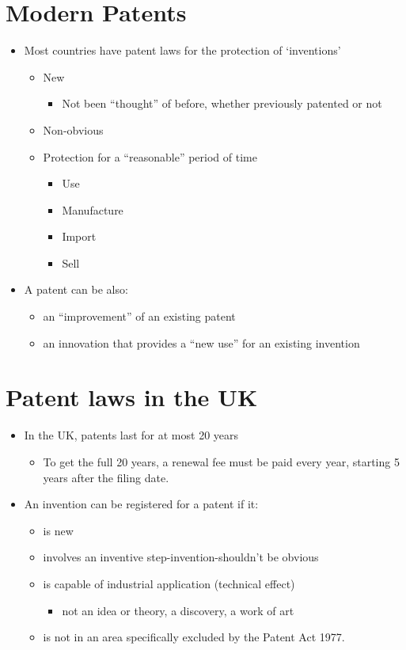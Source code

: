 \documentclass{article}
\begin{document}
\section{Modern Patents}
\begin{itemize}
\item Most countries have patent laws for the protection of `inventions' 
\begin{itemize}
\item New 
\begin{itemize}
\item Not been ``thought'' of before, whether previously patented or not
\end{itemize}
\item Non-obvious
\item Protection for a ``reasonable'' period of time
\begin{itemize}
\item Use
\item Manufacture
\item Import
\item Sell
\end{itemize}
\end{itemize}
\item A patent can be also:
\begin{itemize}
\item an ``improvement'' of an existing patent
\item an innovation that provides a ``new use'' for an existing invention 
\end{itemize}
\end{itemize}



\section{Patent laws in the UK}
\begin{itemize}
\item In the UK, patents last for at most 20 years
\begin{itemize}
\item To get the full 20 years, a renewal fee must be paid every year, starting 5 years after the filing date.
\end{itemize}
\item An invention can be registered for a patent if it:
\begin{itemize}
\item is new
\item involves an inventive step-invention-shouldn't be obvious
\item is capable of industrial application (technical effect)
\begin{itemize}
\item not an idea or theory, a discovery, a work of art
\end{itemize}
\item is not in an area specifically excluded by  the Patent Act 1977.
\end{itemize}
\end{itemize}
\end{document}
